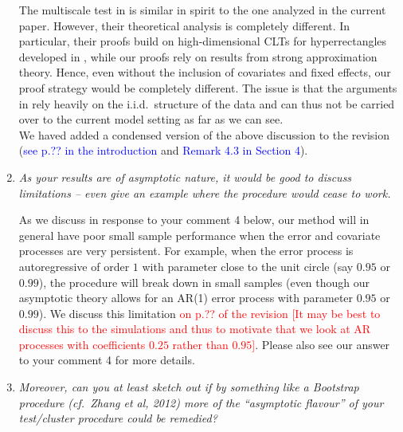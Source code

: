 \documentclass[a4paper,12pt]{article}
\begin{document}
\begin{enumerate}[label=\arabic*.,leftmargin=0.6cm]
The multiscale test in \cite{KhismatullinaVogt2023} is similar in spirit to the one analyzed in the current paper. However, their theoretical analysis is completely different. In particular, their proofs build on high-dimensional CLTs for hyperrectangles developed in \cite{Chernozhukov2017}, while our proofs rely on results from strong approximation theory. Hence, even without the inclusion of covariates and fixed effects, our proof strategy would be completely different. The issue is that the arguments in \cite{KhismatullinaVogt2023} rely heavily on the i.i.d.\ structure of the data and can thus not be carried over to the current model setting as far as we can see. \\
We haved added a condensed version of the above discussion to the revision (\textcolor{blue}{see p.?? in the introduction} and \textcolor{blue}{Remark 4.3 in Section 4}). 


\item \textit{As your results are of asymptotic nature, it would be good to discuss limitations -- even give an example where the procedure would cease to work.}  

As we discuss in response to your comment 4 below, our method will in general have poor small sample performance when the error and covariate processes are very persistent. For example, when the error process is autoregressive of order $1$ with parameter close to the unit circle (say $0.95$ or $0.99$), the procedure will break down in small samples (even though our asymptotic theory allows for an AR(1) error process with parameter $0.95$ or $0.99$). We discuss this limitation \textcolor{red}{on p.?? of the revision [It may be best to discuss this to the simulations and thus to motivate that we look at AR processes with coefficients $0.25$ rather than $0.95$]}. Please also see our answer to your comment 4 for more details.
  

\item \textit{Moreover, can you at least sketch out if by something like a Bootstrap procedure (cf.\ Zhang et al, 2012) more of the ``asymptotic flavour'' of your test/cluster procedure could be remedied?}


\end{enumerate}
\end{document}
